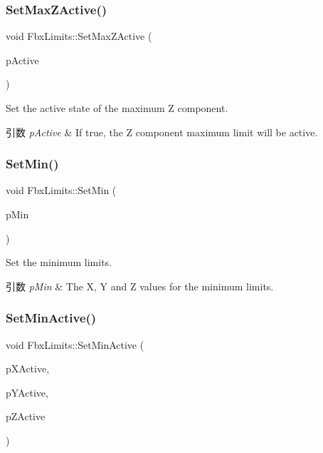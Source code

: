 \subsubsection{\texorpdfstring{Set\+Max\+Z\+Active()}{SetMaxZActive()}}
{\footnotesize\ttfamily void Fbx\+Limits\+::\+Set\+Max\+Z\+Active (\begin{DoxyParamCaption}\item[{bool}]{p\+Active }\end{DoxyParamCaption})}

Set the active state of the maximum Z component. 
\begin{DoxyParams}{引数}
{\em p\+Active} & If true, the Z component maximum limit will be active. \\
\hline
\end{DoxyParams}
\mbox{\label{class_fbx_limits_ad380f8aaba424943aa46a1f8d642e0a2}} 
\subsubsection{\texorpdfstring{Set\+Min()}{SetMin()}}
{\footnotesize\ttfamily void Fbx\+Limits\+::\+Set\+Min (\begin{DoxyParamCaption}\item[{const \hyperlink{fbxtypes_8h_ae0a96f14cde566774c7553aa7523b7a7}{Fbx\+Double3} \&}]{p\+Min }\end{DoxyParamCaption})}

Set the minimum limits. 
\begin{DoxyParams}{引数}
{\em p\+Min} & The X, Y and Z values for the minimum limits. \\
\hline
\end{DoxyParams}
\mbox{\label{class_fbx_limits_a51a68932b8f0c1a97244088d4840e8ea}} 
\subsubsection{\texorpdfstring{Set\+Min\+Active()}{SetMinActive()}}
{\footnotesize\ttfamily void Fbx\+Limits\+::\+Set\+Min\+Active (\begin{DoxyParamCaption}\item[{bool}]{p\+X\+Active,  }\item[{bool}]{p\+Y\+Active,  }\item[{bool}]{p\+Z\+Active }\end{DoxyParamCaption})}

